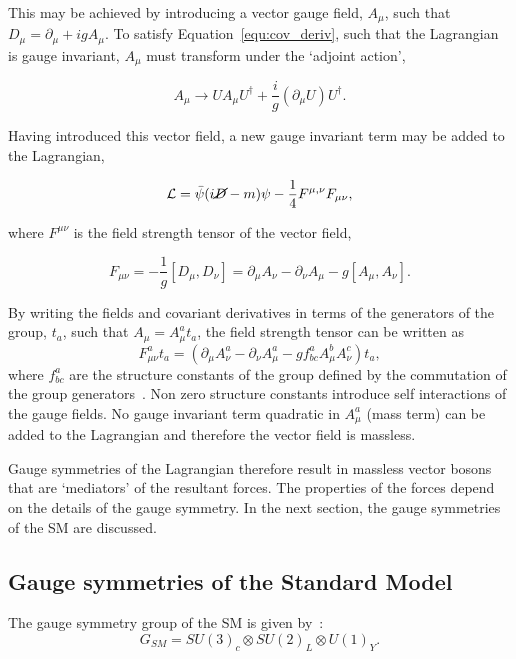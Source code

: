 \noindent This may be achieved by introducing a vector gauge field, $A_\mu$, such that 
$D_{\mu} = \partial_{\mu} + igA_{\mu}$. To satisfy Equation~\ref{equ:cov_deriv},
such that the Lagrangian is gauge invariant, $A_{\mu}$ must transform
under the `adjoint action',

\begin{equation}
A_{\mu} \rightarrow U A_{\mu} U^{\dagger} + \frac{i}{g}(\partial_{\mu}U)U^{\dagger}.
\end{equation}

\noindent Having introduced this vector field, a new gauge invariant term may be added to the Lagrangian,

\begin{equation}
\mathcal{L} = \bar{\psi} (i\cancel{D} - m)\psi - \frac{1}{4}F^{\mu,\nu}F_{\mu\nu},
\end{equation}

\noindent where $F^{\mu\nu}$ is the field strength tensor of the vector field,

\begin{equation}
F_{\mu\nu} = - \frac{1}{g}\left[D_{\mu},D_{\nu}\right] = \partial_{\mu}A_{\nu} - \partial_{\nu} A_{\mu} - g\left[A_{\mu},A_{\nu}\right].
\end{equation}

\noindent By writing the fields and covariant derivatives in terms of the generators of the group, $t_{a}$, such
that $A_{\mu} = A^{a}_{\mu} t_{a}$, the field strength tensor can be written as 
\begin{equation}
F^{a}_{\mu\nu}t_{a} = \left(\partial_{\mu}A^{a}_{\nu} - \partial_{\nu} A^{a}_{\mu} - g f_{bc}^{a}A^b_{\mu}A^c_{\nu}\right)t_a,
\end{equation}
where $f_{bc}^{a}$ are the structure constants of the group defined by the 
commutation of the group generators~\cite{wei1963lie}. Non zero structure constants introduce
self interactions of the gauge fields. No gauge invariant term quadratic 
in $A^a_\mu$ (mass term) can be added to the Lagrangian and 
therefore the vector field is massless.

Gauge symmetries of the Lagrangian therefore result in massless vector 
bosons that are `mediators' of the resultant forces. The properties of
the forces depend on the details of the gauge symmetry. 
In the next section, the gauge symmetries
of the SM are discussed. 

\subsection{Gauge symmetries of the Standard Model}
\label{sec:sm-gs}
The gauge symmetry group of the SM is given by~\cite{ewk-int}:
\begin{equation}
G_{SM} = SU(3)_{c}\otimes SU(2)_{L}\otimes U(1)_{Y}.
\end{equation}

